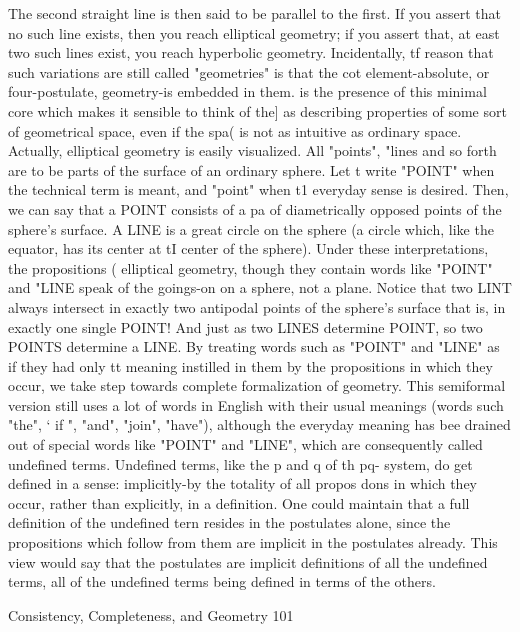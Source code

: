          The second straight line is then said to be parallel to the first. If you assert that no
such line exists, then you reach elliptical geometry; if you assert that, at east two such
lines exist, you reach hyperbolic geometry. Incidentally, tf reason that such variations are
still called "geometries" is that the cot element-absolute, or four-postulate, geometry-is
embedded in them. is the presence of this minimal core which makes it sensible to think
of the] as describing properties of some sort of geometrical space, even if the spa( is not
as intuitive as ordinary space.
         Actually, elliptical geometry is easily visualized. All "points", "lines and so forth
are to be parts of the surface of an ordinary sphere. Let t write "POINT" when the
technical term is meant, and "point" when t1 everyday sense is desired. Then, we can say
that a POINT consists of a pa of diametrically opposed points of the sphere's surface. A
LINE is a great circle on the sphere (a circle which, like the equator, has its center at tI
center of the sphere). Under these interpretations, the propositions ( elliptical geometry,
though they contain words like "POINT" and "LINE speak of the goings-on on a sphere,
not a plane. Notice that two LINT always intersect in exactly two antipodal points of the
sphere's surface that is, in exactly one single POINT! And just as two LINES determine
POINT, so two POINTS determine a LINE.
         By treating words such as "POINT" and "LINE" as if they had only tt meaning
instilled in them by the propositions in which they occur, we take step towards complete
formalization of geometry. This semiformal version still uses a lot of words in English
with their usual meanings (words such "the", ` if ", "and", "join", "have"), although the
everyday meaning has bee drained out of special words like "POINT" and "LINE", which
are consequently called undefined terms. Undefined terms, like the p and q of th pq-
system, do get defined in a sense: implicitly-by the totality of all propos dons in which
they occur, rather than explicitly, in a definition.
         One could maintain that a full definition of the undefined tern resides in the
postulates alone, since the propositions which follow from them are implicit in the
postulates already. This view would say that the postulates are implicit definitions of all
the undefined terms, all of the undefined terms being defined in terms of the others.




Consistency, Completeness, and Geometry                                                     101

